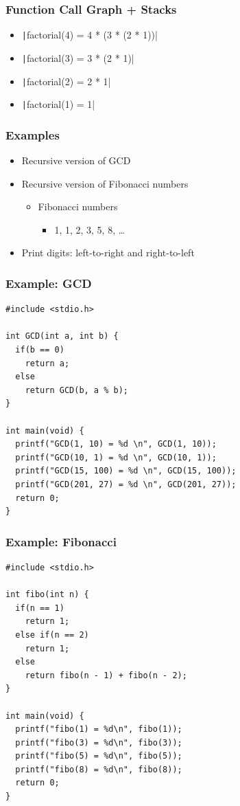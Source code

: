 \documentclass{../c-lecture}
\begin{document}
\begin{frame}[fragile]
  \frametitle{Function Call Graph + Stacks}
  \begin{itemize}
    \item<1-> \texttt|factorial(4) = 4 * (3 * (2 * 1))|
    \item<2-> \texttt|factorial(3) = 3 * (2 * 1)|
    \item<3-> \texttt|factorial(2) = 2 * 1|
    \item<4-> \texttt|factorial(1) = 1|
  \end{itemize}
\end{frame}

\begin{frame}
  \frametitle{Examples}
  \begin{itemize}
    \item Recursive version of GCD
    \item Recursive version of Fibonacci numbers
    \begin{itemize}
      \item Fibonacci numbers
      \begin{itemize}
        \item 1, 1, 2, 3, 5, 8, \ldots
      \end{itemize}
    \end{itemize}
    \item Print digits: left-to-right and right-to-left
  \end{itemize}
\end{frame}

\begin{frame}[fragile]
  \frametitle{Example: GCD}
  \scriptsize
  \begin{verbatim}
#include <stdio.h>

int GCD(int a, int b) {
  if(b == 0)
    return a;
  else
    return GCD(b, a % b);
}

int main(void) {
  printf("GCD(1, 10) = %d \n", GCD(1, 10));
  printf("GCD(10, 1) = %d \n", GCD(10, 1));
  printf("GCD(15, 100) = %d \n", GCD(15, 100));
  printf("GCD(201, 27) = %d \n", GCD(201, 27));
  return 0;
}
  \end{verbatim}
\end{frame}

\begin{frame}[fragile]
  \frametitle{Example: Fibonacci}
  \scriptsize
  \begin{verbatim}
#include <stdio.h>

int fibo(int n) {
  if(n == 1)
    return 1;
  else if(n == 2)
    return 1;
  else
    return fibo(n - 1) + fibo(n - 2);
}

int main(void) {
  printf("fibo(1) = %d\n", fibo(1));
  printf("fibo(3) = %d\n", fibo(3));
  printf("fibo(5) = %d\n", fibo(5));
  printf("fibo(8) = %d\n", fibo(8));
  return 0;
}
  \end{verbatim}
\end{frame}
\end{document}
